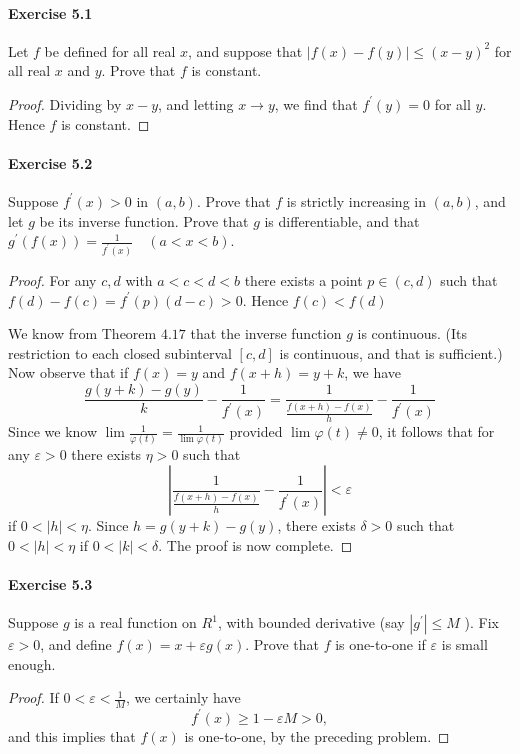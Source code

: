 \documentclass{article}
\theoremstyle{definition}
\begin{document}
\paragraph{Exercise 5.1} Let $f$ be defined for all real $x$, and suppose that $|f(x)-f(y)| \leq (x-y)^{2}$ for all real $x$ and $y$. Prove that $f$ is constant.
\begin{proof}
    Dividing by $x-y$, and letting $x \rightarrow y$, we find that $f^{\prime}(y)=0$ for all $y$. Hence $f$ is constant.
\end{proof}



\paragraph{Exercise 5.2} Suppose $f^{\prime}(x)>0$ in $(a, b)$. Prove that $f$ is strictly increasing in $(a, b)$, and let $g$ be its inverse function. Prove that $g$ is differentiable, and that $g^{\prime}(f(x))=\frac{1}{f^{\prime}(x)} \quad(a<x<b)$.
\begin{proof}
   For any $c, d$ with $a<c<d<b$ there exists a point $p \in(c, d)$ such that $f(d)-f(c)=f^{\prime}(p)(d-c)>0$. Hence $f(c)<f(d)$

We know from Theorem $4.17$ that the inverse function $g$ is continuous. (Its restriction to each closed subinterval $[c, d]$ is continuous, and that is sufficient.) Now observe that if $f(x)=y$ and $f(x+h)=y+k$, we have
$$
\frac{g(y+k)-g(y)}{k}-\frac{1}{f^{\prime}(x)}=\frac{1}{\frac{f(x+h)-f(x)}{h}}-\frac{1}{f^{\prime}(x)}
$$
Since we know $\lim \frac{1}{\varphi(t)}=\frac{1}{\lim \varphi(t)}$ provided $\lim \varphi(t) \neq 0$, it follows that for any $\varepsilon>0$ there exists $\eta>0$ such that
$$
\left|\frac{1}{\frac{f(x+h)-f(x)}{h}}-\frac{1}{f^{\prime}(x)}\right|<\varepsilon
$$
if $0<|h|<\eta$. Since $h=g(y+k)-g(y)$, there exists $\delta>0$ such that $0<|h|<\eta$ if $0<|k|<\delta$. The proof is now complete. 
\end{proof}



\paragraph{Exercise 5.3} Suppose $g$ is a real function on $R^{1}$, with bounded derivative (say $\left|g^{\prime}\right| \leq M$ ). Fix $\varepsilon>0$, and define $f(x)=x+\varepsilon g(x)$. Prove that $f$ is one-to-one if $\varepsilon$ is small enough.
\begin{proof}
    If $0<\varepsilon<\frac{1}{M}$, we certainly have
$$
f^{\prime}(x) \geq 1-\varepsilon M>0,
$$
and this implies that $f(x)$ is one-to-one, by the preceding problem.
\end{proof}
\end{document}
